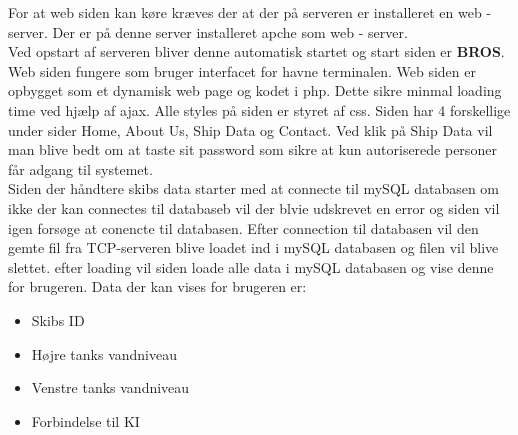 For at web siden kan køre kræves der at der på serveren er installeret en web - server. Der er på denne server installeret apche som web - server.\\
Ved opstart af serveren bliver denne automatisk startet og start siden er \textbf{BROS}. Web siden fungere som bruger interfacet for havne terminalen. Web siden er opbygget som et dynamisk web page og kodet i php. Dette sikre minmal loading time ved hjælp af ajax. Alle styles på siden er styret af css. Siden har 4 forskellige under sider Home, About Us, Ship Data og Contact. Ved klik på Ship Data vil man blive bedt om at taste sit password som sikre at kun autoriserede personer får adgang til systemet.\\
Siden der håndtere skibs data starter med at connecte til mySQL databasen om ikke der kan connectes til databaseb vil der blvie udskrevet en error og siden vil igen forsøge at conencte til databasen. Efter connection til databasen vil den gemte fil fra TCP-serveren blive loadet ind i mySQL databasen og filen vil blive slettet. efter loading vil siden loade alle data i mySQL databasen og vise denne for brugeren. Data der kan vises for brugeren er:
\begin{itemize}
	\item Skibs ID
	\item Højre tanks vandniveau
	\item Venstre tanks vandniveau
	\item Forbindelse til KI
\end{itemize}






